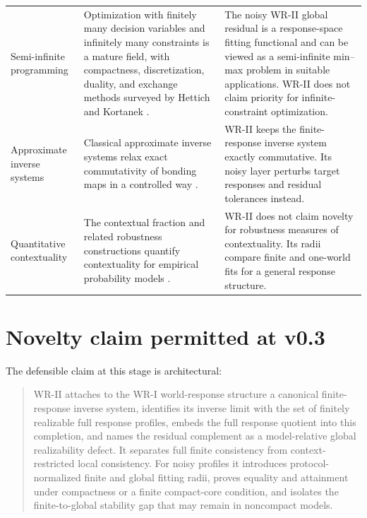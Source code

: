 \documentclass[11pt]{article}
\begin{document}
\begin{longtable}{>{\raggedright\arraybackslash}p{}
                  >{\raggedright\arraybackslash}p{}
                  >{\raggedright\arraybackslash}p{}}
Semi-infinite programming &
Optimization with finitely many decision variables and infinitely many
constraints is a mature field, with compactness, discretization, duality, and
exchange methods surveyed by Hettich and Kortanek
\cite{HettichKortanek1993}. &
The noisy WR-II global residual is a response-space fitting functional and can
be viewed as a semi-infinite min--max problem in suitable applications. WR-II
does not claim priority for infinite-constraint optimization. \\[5pt]

Approximate inverse systems &
Classical approximate inverse systems relax exact commutativity of bonding maps
in a controlled way \cite{MardesicRubin1989,MardesicSegal1989}. &
WR-II keeps the finite-response inverse system exactly commutative. Its noisy
layer perturbs target responses and residual tolerances instead. \\[5pt]

Quantitative contextuality &
The contextual fraction and related robustness constructions quantify
contextuality for empirical probability models
\cite{AbramskyBarbosaMansfield2017}. &
WR-II does not claim novelty for robustness measures of contextuality. Its
radii compare finite and one-world fits for a general response structure. \\
\bottomrule
\end{longtable}

\section{Novelty claim permitted at v0.3}

The defensible claim at this stage is architectural:

\begin{quote}
WR-II attaches to the WR-I world-response structure a canonical finite-response
inverse system, identifies its inverse limit with the set of finitely realizable
full response profiles, embeds the full response quotient into this completion,
and names the residual complement as a model-relative global realizability
defect. It separates full finite consistency from context-restricted local
consistency. For noisy profiles it introduces protocol-normalized finite and
global fitting radii, proves equality and attainment under compactness or a
finite compact-core condition, and isolates the finite-to-global stability gap
that may remain in noncompact models.
\end{quote}
\end{document}
